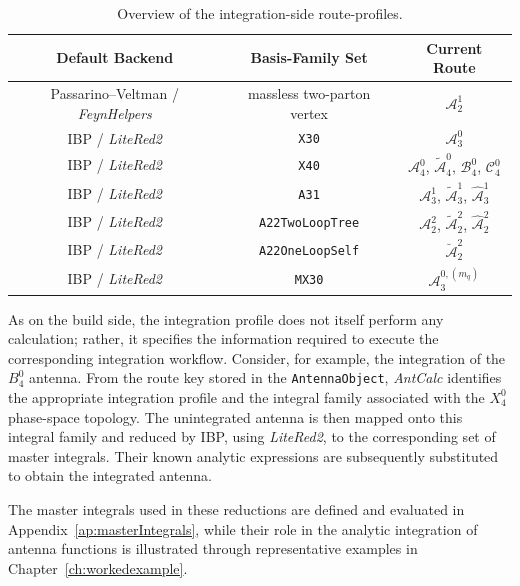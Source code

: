 \begin{table}[h!]
\footnotesize
\centering
\caption{Overview of the integration-side route-profiles.}
\renewcommand{\arraystretch}{1.3}
  \begin{tabular}{|c|c|c|} 
   \hline
   \textbf{Default Backend} & \textbf{Basis-Family Set} & \textbf{Current Route} \\
   \hline
   Passarino--Veltman / \textit{FeynHelpers} & massless two-parton vertex & $\mathcal A_2^1$ \\ \hline
   IBP / \textit{LiteRed2} & \texttt{X30} & $\mathcal A_3^0$ \\ \hline
   IBP / \textit{LiteRed2} & \texttt{X40} & $\mathcal A_4^0$, $\tilde{\mathcal A}_4^0$, $\mathcal B_4^0$, $\mathcal C_4^0$ \\ \hline
   IBP / \textit{LiteRed2} & \texttt{A31} & $\mathcal A_3^1$, $\tilde{\mathcal A}_3^1$, $\hat{\mathcal A}_3^1$ \\ \hline
   IBP / \textit{LiteRed2} & \texttt{A22TwoLoopTree} & $\mathcal A_2^2$, $\tilde{\mathcal A}_2^2$, $\hat{\mathcal A}_2^2$ \\ \hline
   IBP / \textit{LiteRed2} & \texttt{A22OneLoopSelf} & $\breve{\mathcal A}_2^2$ \\ \hline
   IBP / \textit{LiteRed2} & \texttt{MX30} & $\mathcal A_3^{0,(m_q)}$ \\ \hline
  \end{tabular}

\label{tab:intModes}
\end{table}



As on the build side, the integration profile does not itself perform any calculation; rather,
it specifies the information required to execute the corresponding integration workflow.
Consider, for example, the integration of the $B_4^0$ antenna. From the route key stored in
the \texttt{AntennaObject}, \textit{AntCalc} identifies the appropriate integration profile and
the integral family associated with the $X_4^0$ phase-space topology. The unintegrated antenna
is then mapped onto this integral family and reduced by IBP, using \textit{LiteRed2}, to the
corresponding set of master integrals. Their known analytic expressions are subsequently
substituted to obtain the integrated antenna.

The master integrals used in these reductions are defined and evaluated in
Appendix~\ref{ap:masterIntegrals}, while their role in the analytic integration of antenna
functions is illustrated through representative examples in Chapter~\ref{ch:workedexample}.



